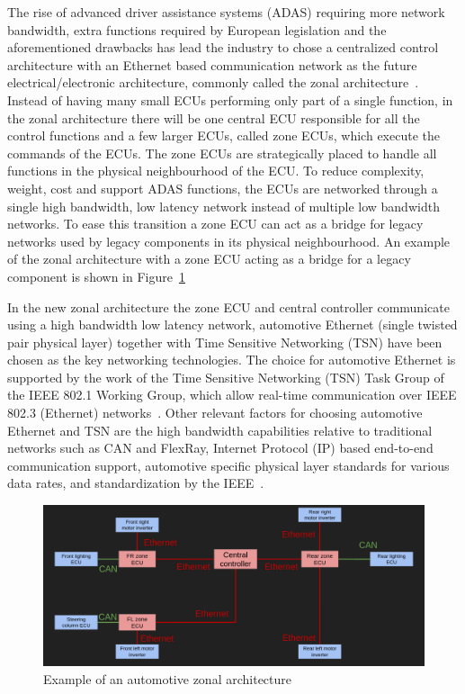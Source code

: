 The rise of advanced driver assistance systems (ADAS) requiring more network bandwidth, extra functions required by European legislation and the aforementioned drawbacks has lead the industry to chose a centralized control architecture with an Ethernet based communication network as the future electrical/electronic architecture, commonly called the zonal architecture~\cite{ashjaei2021time}. Instead of having many small ECUs performing only part of a single function, in the zonal architecture there will be one central ECU responsible for all the control functions and a few larger ECUs, called zone ECUs, which execute the commands of the ECUs. The zone ECUs are strategically placed to handle all functions in the physical neighbourhood of the ECU. To reduce complexity, weight, cost and support ADAS functions, the ECUs are networked through a single high bandwidth, low latency network instead of multiple low bandwidth networks. To ease this transition a zone ECU can act as a bridge for legacy networks used by legacy components in its physical neighbourhood. An example of the zonal architecture with a zone ECU acting as a bridge for a legacy component is shown in Figure~\ref{fig:zonal-arch}

In the new zonal architecture the zone ECU and central controller communicate using a high bandwidth low latency network, automotive Ethernet (single twisted pair physical layer) together with Time Sensitive Networking (TSN) have been chosen as the key networking technologies. The choice for automotive Ethernet is supported by the work of the Time Sensitive Networking (TSN) Task Group of the IEEE 802.1 Working Group, which allow real-time communication over IEEE 802.3 (Ethernet) networks~\cite{klaus2019zonal}. Other relevant factors for choosing automotive Ethernet and TSN are the high bandwidth capabilities relative to traditional networks such as CAN and FlexRay, Internet Protocol (IP) based end-to-end communication support, automotive specific physical layer standards for various data rates, and standardization by the IEEE~\cite{ashjaei2021time}.

\begin{figure}[htb]
    \centering
    \includegraphics[width=\textwidth]{images/zone-arch.png}
    \caption{Example of an automotive zonal architecture}
    \label{fig:zonal-arch}
\end{figure}

